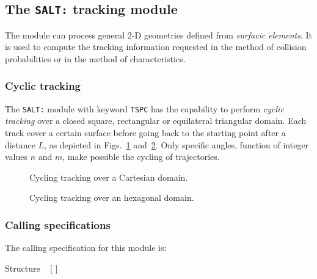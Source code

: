 \subsection{The {\tt SALT:} tracking module}\label{sect:SALTData1}

The  module can process general 2-D geometries defined from
{\sl surfacic elements}. It is used to compute the tracking information requested in
the method of collision probabilities or in the method of characteristics.

\subsubsection{Cyclic tracking}

The {\tt SALT:} module with keyword {\tt TSPC} has the capability to perform {\sl cyclic tracking} over a closed square, rectangular
or equilateral triangular domain. Each track cover a certain surface before going back to the starting point after a distance $L$, as
depicted in Figs.~\ref{fig:cart_tspc} and~\ref{fig:hex_tspc}. Only specific angles, function of integer values $n$ and $m$, make
possible the cycling of trajectories.

\begin{figure}[h!]
\begin{center} 
\epsfxsize=10cm \centerline{ }
\parbox{14.0cm}{\caption{Cycling tracking over a Cartesian domain.}\label{fig:cart_tspc}}   
\end{center}  
\end{figure}

\begin{figure}[h!]
\begin{center} 
\epsfxsize=15cm \centerline{ }
\parbox{14.0cm}{\caption{Cycling tracking over an hexagonal domain.}\label{fig:hex_tspc}}   
\end{center}  
\end{figure}

\subsubsection{Calling specifications}

The calling specification for this module is:
\begin{DataStructure}{Structure }
 
\moc{:=} ~ $[$  $]$ \moc{::}  
\end{DataStructure}

